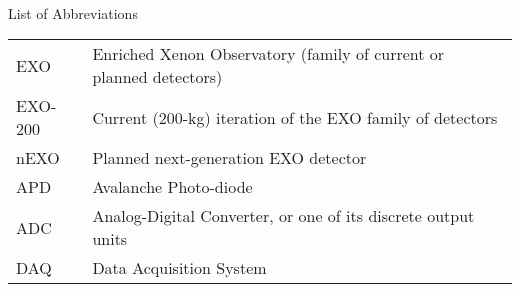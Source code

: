 
\renewcommand{\baselinestretch}{1}
\small\normalsize
\hbox{\ }

\vspace{-4em}

\begin{center}
\large{List of Abbreviations}
\end{center} 

\vspace{3pt}

\begin{tabular}{ll}
EXO & Enriched Xenon Observatory (family of current or planned detectors) \\
EXO-200 & Current (200-kg) iteration of the EXO family of detectors \\
nEXO & Planned next-generation EXO detector \\
APD & Avalanche Photo-diode \\
ADC & Analog-Digital Converter, or one of its discrete output units \\
DAQ & Data Acquisition System \\
\end{tabular}
